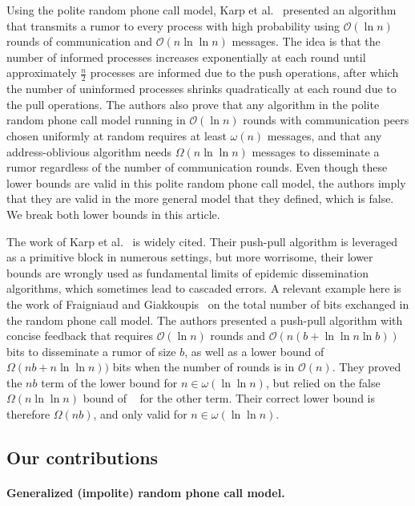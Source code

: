 Using the polite random phone call model, Karp et al.~\cite{DBLP:conf/focs/KarpSSV00} presented an algorithm that transmits a rumor to every process with high probability using $\mathcal{O}(\ln n)$ rounds of communication and $\mathcal{O}(n \ln \ln n)$ messages. The idea is that the number of informed processes increases exponentially at each round until approximately $\frac{n}{2}$ processes are informed due to the push operations, after which the number of uninformed processes shrinks quadratically at each round due to the pull operations. The authors also prove that any algorithm in the polite random phone call model running in $\mathcal{O}(\ln n)$ rounds with communication peers chosen uniformly at random requires at least $\omega(n)$ messages, and that any address-oblivious algorithm needs $\Omega(n \ln \ln n)$ messages to disseminate a rumor regardless of the number of communication rounds. Even though these lower bounds are valid in this polite random phone call model, the authors imply that they are valid in the more general model that they defined, which is false. We break both lower bounds in this article.

The work of Karp et al.~\cite{DBLP:conf/focs/KarpSSV00} is widely cited. Their push-pull algorithm is leveraged as a primitive block in numerous settings, but more worrisome, their lower bounds are wrongly used as fundamental limits of epidemic dissemination algorithms, which sometimes lead to cascaded errors. A relevant example here is the work of Fraigniaud and Giakkoupis~\cite{DBLP:conf/spaa/FraigniaudG10} on the total number of bits exchanged in the random phone call model. The authors presented a push-pull algorithm with concise feedback that requires $\mathcal{O}(\ln n)$ rounds and $\mathcal{O}(n(b + \ln \ln n \ln b))$ bits to disseminate a rumor of size $b$, as well as a lower bound of  $\Omega(nb + n \ln \ln n))$ bits when the number of rounds is in $\mathcal{O}(n)$. They proved the $nb$ term of the lower bound for $n \in \omega(\ln \ln n)$, but relied on the false $\Omega(n \ln \ln n)$ bound of ~\cite{DBLP:conf/focs/KarpSSV00} for the other term. Their correct lower bound is therefore $\Omega(nb)$, and only valid for $n \in \omega(\ln \ln n)$. 

\subsection{Our contributions}

\paragraph{\textbf{Generalized (impolite) random phone call model.}}

